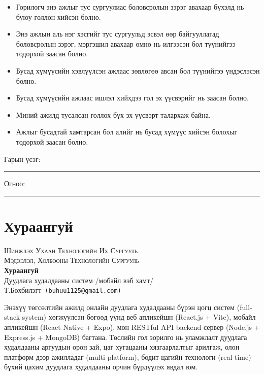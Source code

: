 \documentclass[12pt, a4paper]{report}
\makeatletter
\newcommand{\thesistitle}{Дуудлага худалдааны систем /мобайл вэб хамт/}
\newcommand{\authorshort}{Т.Бөхбилэгт}
\newcommand{\universityname}{Шинжлэх Ухаан Технологийн Их Сургууль}
\newcommand{\facultyname}{Мэдээлэл, Холбооны Технологийн Сургууль}
\newcommand{\authormail}{buhuu1125@gmail.com}
\makeatother
\begin{document}
\begin{itemize}
\item Горилогч энэ ажлыг тус сургуулиас боловсролын зэрэг авахаар бүхэлд нь буюу голлон хийсэн болно.
\item Энэ ажлын аль нэг хэсгийг тус сургуульд эсвэл өөр байгууллагад боловсролын зэрэг, мэргэшил авахаар өмнө нь илгээсэн бол түүнийгээ тодорхой заасан болно.
\item Бусад хүмүүсийн хэвлүүлсэн ажлаас зөвлөгөө авсан бол түүнийгээ үндэслэсэн болно.
\item Бусад хүмүүсийн ажлаас ишлэл хийхдээ гол эх үүсвэрийг нь заасан болно.
\item Миний ажилд тусалсан голлох бүх эх үүсвэрт талархаж байна.
\item Ажлыг бусадтай хамтарсан бол алийг нь бусад хүмүүс хийсэн болохыг тодорхой заасан болно.
\end{itemize}
\bigskip

\noindent Гарын үсэг:\rule[-0.5em]{12.7em}{0.5pt}
\bigskip

\noindent Огноо:\rule[-0.5em]{15em}{0.5pt}

\clearpage

\chapter*{Хураангуй}
\thispagestyle{plain}

\begin{center}
{\scshape\Large \universityname}\\[0.2cm]
{\scshape\large \facultyname}\\[0.5cm]
{\huge\textbf{Хураангуй}}\\[0.4cm]
{\Large \thesistitle}\\[0.3cm]
{\normalsize \authorshort\ \texttt{(\authormail)}}
\end{center}

\bigskip

Энэхүү төгсөлтийн ажилд онлайн дуудлага худалдааны бүрэн цогц систем (full-stack system)
хөгжүүлсэн бөгөөд үүнд веб апликейшн (React.js + Vite), мобайл апликейшн
(React Native + Expo), мөн RESTful API backend сервер (Node.js + Express.js + MongoDB)
багтана. Төслийн гол зорилго нь уламжлалт дуудлага худалдааны аргуудын орон зай, цаг
хугацааны хязгаарлалтыг арилгаж, олон платформ дээр ажилладаг (multi-platform), бодит
цагийн технологи (real-time) бүхий цахим дуудлага худалдааны орчин бүрдүүлэх явдал юм.
\end{document}

